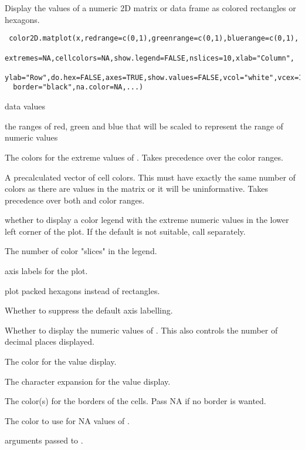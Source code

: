 \begin{Description}\relax
Display the values of a numeric 2D matrix or data frame as colored
rectangles or hexagons.
\end{Description}
\begin{Usage}
\begin{verbatim}
 color2D.matplot(x,redrange=c(0,1),greenrange=c(0,1),bluerange=c(0,1),
  extremes=NA,cellcolors=NA,show.legend=FALSE,nslices=10,xlab="Column",
  ylab="Row",do.hex=FALSE,axes=TRUE,show.values=FALSE,vcol="white",vcex=1,
  border="black",na.color=NA,...)
\end{verbatim}
\end{Usage}
\begin{Arguments}
\begin{ldescription}
\item[\code{x}] data values
\item[\code{redrange, greenrange, bluerange}] the ranges of red, green and blue
that will be scaled to represent the range of numeric values
\item[\code{extremes}] The colors for the extreme values of . Takes
precedence over the color ranges.
\item[\code{cellcolors}] A precalculated vector of cell colors. This must have
exactly the same number of colors as there are values in the matrix or
it will be uninformative. Takes precedence over both 
and color ranges.
\item[\code{show.legend}] whether to display a color legend with the
extreme numeric values in the lower left corner of the plot. If the
default is not suitable, call  separately.
\item[\code{nslices}] The number of color "slices" in the legend.
\item[\code{xlab,ylab}] axis labels for the plot.
\item[\code{do.hex}] plot packed hexagons instead of rectangles.
\item[\code{axes}] Whether to suppress the default axis labelling.
\item[\code{show.values}] Whether to display the numeric values of .
This also controls the number of decimal places displayed.
\item[\code{vcol}] The color for the value display.
\item[\code{vcex}] The character expansion for the value display.
\item[\code{border}] The color(s) for the borders of the cells. Pass NA
if no border is  wanted.
\item[\code{na.color}] The color to use for NA values of .
\item[\code{...}] arguments passed to .
\end{ldescription}
\end{Arguments}
